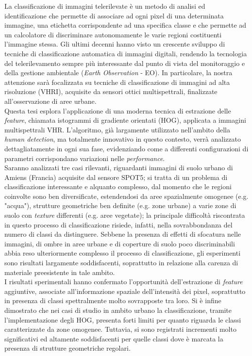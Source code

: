 
\italiano
\sommario
{}
La classificazione di immagini telerilevate è un metodo di analisi ed identificazione che permette di associare ad ogni pixel di una determinata immagine, una etichetta corrispondente ad una specifica classe e che permette ad un calcolatore di discriminare autonomamente le varie regioni costituenti l'immagine stessa. Gli ultimi decenni hanno visto un crescente sviluppo di tecniche di classificazione automatica di immagini digitali, rendendo la tecnologia del telerilevamento sempre più interessante dal punto di vista del monitoraggio e della gestione ambientale (\emph{Earth Observation} - EO).
In particolare, la nostra attenzione sarà focalizzata su tecniche di classificazione di immagini ad alta risoluzione (VHRI), acquisite da sensori ottici multispettrali, finalizzate all'osservazione di aree urbane. 
\\
Questa tesi esplora l'applicazione di una moderna tecnica di estrazione delle \emph{feature}, chiamata istogrammi di gradiente orientati (HOG), applicata a immagini multispettrali VHR.   
L'algoritmo, già largamente utilizzato nell'ambito della \emph{human detection}, ma totalmente innovativo in questo contesto, verrà analizzato dettagliatamente in ogni sua fase, evidenziando come a differenti configurazioni di parametri corrispondano variazioni nelle \emph{performance}. 
\\
Saranno analizzati tre casi rilevanti, riguardanti immagini di suolo urbano di Amiens (Francia) acquisite dal sensore SPOT5; si tratta di un problema di classificazione interessante e alquanto complesso, dal momento che le regioni coinvolte sono ben diversificate, estendendosi da aree spazialmente omogenee (e.g. "acqua"), strutture geometriche ben definite (e.g. zone urbane) a varie zone di suolo con \emph{texture} differenti (e.g. aree vegetate); la principale difficoltà riscontrata in questo processo di classificazione risiede, infatti, nella sovrabbondanza del numero di classi da distinguere.
Sebbene la presenza di effetti di sfocatura nelle immagini, di ombre in aree urbane e di coperture di suolo poco discriminabili abbia reso ulteriormente complesso il processo di classificazione, gli esperimenti sono risultati largamente soddisfacenti, soprattutto in relazione alla carenza di materiale preesistente in tale ambito.
\\
I risultati sperimentali hanno confermato l'opportunità dell'estrazione di \emph{feature} aggiuntive, associate all'informazione spaziale dell'intensità dei pixel, soprattutto in presenza di  classi spettralmente molto sovrapposte tra loro. Si è infine dimostrato che nei casi di studio in ambito urbano la classificazione, tramite l'implementazione degli HOG, presenta forti limiti per quanto riguarda le classi caratterizzate da zone omogenee. Tuttavia, si sono registrati incrementi molto significativi ed altamente soddisfacenti per quelle classi dove è marcata la presenza di strutture geometriche regolari.
